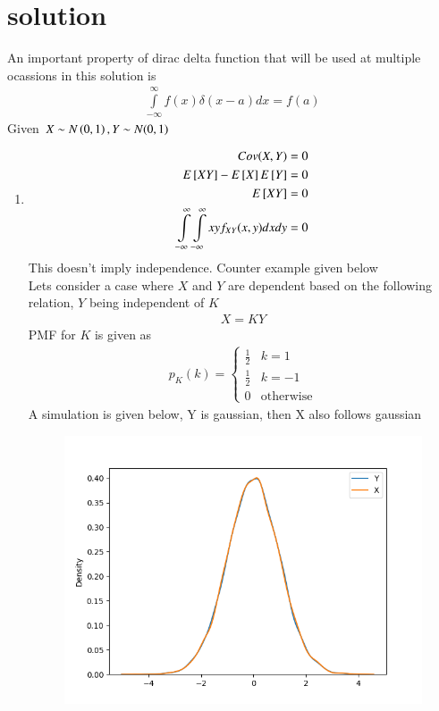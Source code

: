 \documentclass[journal,12pt,twocolumn]{IEEEtran}
\begin{document}
\section{solution}
An important property of dirac delta function that will be used at multiple ocassions in this solution is
\begin{align}
\displaystyle\int\limits_{-\infty}^{\infty} f(x)\delta(x-a)dx=f(a) \label{eq:dirac}
\end{align}
Given $X\sim N\left(0,1\right), Y\sim N(0,1)$
\begin{enumerate}
\item
\begin{align}
Cov(X,Y)=0\\
E{}\left[XY\right]-E{}\left[X\right]E{}\left[Y\right]=0\\
E{}\left[XY\right]=0\\
\displaystyle \int\limits_{-\infty}^{\infty} \int\limits_{-\infty}^{\infty}xyf_{XY}(x,y) dxdy=0
\end{align}
This doesn't imply independence. Counter example given below\\
Lets consider a case where $X$ and $Y$ are dependent based on the following relation, $Y$ being independent of $K$
\begin{align}
X=KY \label{eq:case}
\end{align}
PMF for $K$ is given as
\begin{align}
p_K(k)=
\begin{cases}
\frac{1}{2} &k=1\\
\frac{1}{2} & k=-1\\
0 & \text{otherwise}
\end{cases}
\end{align}
A simulation is given below, Y is gaussian, then X also follows gaussian
\begin{figure}[H]
\centering
\includegraphics[width=\linewidth]{figure/fig}

\end{figure}
\end{enumerate}
\end{document}
